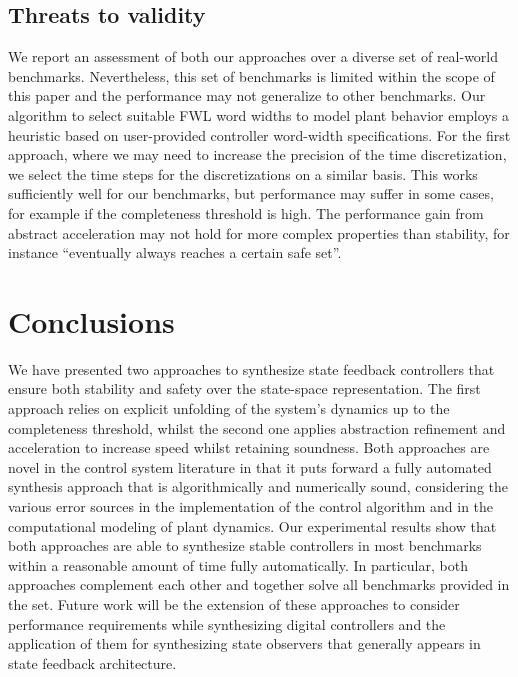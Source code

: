 \documentclass[runningheads,a4paper]{llncs}
\begin{document}
\subsection{Threats to validity}
We report an assessment of both our approaches over a diverse set of real-world benchmarks. Nevertheless, this set of benchmarks is limited within the scope of this paper and the performance may not generalize to other benchmarks. 
%
Our algorithm to select suitable FWL word widths to model plant behavior employs a heuristic based on user-provided controller word-width specifications. For the first approach, where we may need to increase the precision of the time discretization, we select the time steps for the discretizations on a similar basis. This works sufficiently well for our benchmarks, but performance may suffer in some cases, for example if the completeness threshold is high. 
%
The performance gain from abstract acceleration may not hold for more complex properties than stability, for instance ``eventually always reaches a certain safe set''. 





\section{Conclusions}

We have presented two approaches to synthesize state feedback controllers 
that ensure both stability and safety over the state-space representation.
The first approach relies on explicit unfolding of the system's dynamics 
up to the completeness threshold, whilst the second one applies abstraction 
refinement and acceleration to increase speed whilst retaining soundness.
Both approaches are novel in the control system literature in that it puts
forward a fully automated synthesis approach that is algorithmically and
numerically sound, considering the various error sources in the implementation 
of the control algorithm and in the computational modeling of plant dynamics.
Our experimental results show that both approaches are able
to synthesize stable controllers in most benchmarks within a reasonable
amount of time fully automatically.  In particular, both approaches
complement each other and together solve all benchmarks provided in the set.
Future work will be the extension of these approaches to consider performance 
requirements while synthesizing digital controllers and the application of them
for synthesizing state observers that generally appears in state feedback 
architecture.
\end{document}
